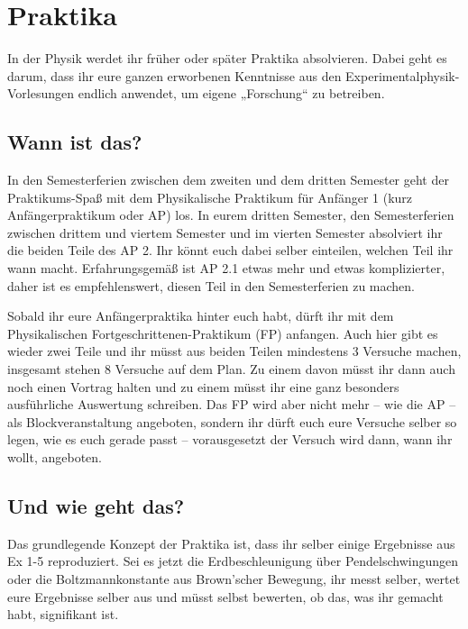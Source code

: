 \vspace{-4mm}

\section{Praktika}

In der Physik werdet ihr früher oder später Praktika absolvieren. Dabei geht es darum, dass ihr eure ganzen erworbenen Kenntnisse aus den Experimentalphysik-Vorlesungen endlich anwendet, um eigene „Forschung“ zu betreiben.


\subsection{Wann ist das?}
In den Semesterferien zwischen dem zweiten und dem dritten Semester geht der Praktikums-Spaß mit dem Physikalische Praktikum für Anfänger 1 (kurz Anfängerpraktikum oder \gls{AP}) los. In eurem dritten Semester, den Semesterferien zwischen drittem und viertem Semester und im vierten Semester absolviert ihr die beiden Teile des AP 2. Ihr könnt euch dabei selber einteilen, welchen Teil ihr wann macht. Erfahrungsgemäß ist AP 2.1 etwas mehr und etwas komplizierter, daher ist es empfehlenswert, diesen Teil in den Semesterferien zu machen.

Sobald ihr eure Anfängerpraktika hinter euch habt, dürft ihr mit dem Physikalischen Fortgeschrittenen-Praktikum (\gls{FP}) anfangen. Auch hier gibt es wieder zwei Teile und ihr müsst aus beiden Teilen mindestens 3 Versuche machen, insgesamt stehen 8 Versuche auf dem Plan. Zu einem davon müsst ihr dann auch noch einen Vortrag halten und zu einem müsst ihr eine ganz besonders ausführliche Auswertung schreiben. Das FP wird aber nicht mehr -- wie die AP -- als Blockveranstaltung angeboten, sondern ihr dürft euch eure Versuche selber so legen, wie es euch gerade passt -- vorausgesetzt der Versuch wird dann, wann ihr wollt, angeboten.

\subsection{Und wie geht das?}
Das grundlegende Konzept der Praktika ist, dass ihr selber einige Ergebnisse aus Ex 1-5 reproduziert. Sei es jetzt die Erdbeschleunigung über Pendelschwingungen oder die Boltzmannkonstante aus Brown'scher Bewegung, ihr messt selber, wertet eure Ergebnisse selber aus und müsst selbst bewerten, ob das, was ihr gemacht habt, signifikant ist.

